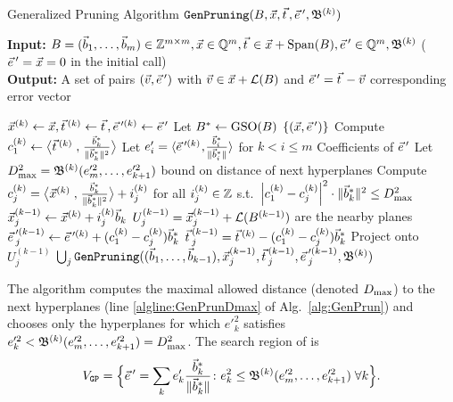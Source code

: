 %
%
\begin{algorithm}[t]
\caption{Generalized Pruning Algorithm $\GenPrun(\BMat, \protect \xvec, \protect \tvec, \protect \evec', \B^{(k)})$}
\label{alg:GenPrun}
\textbf{Input:} $\BMat=(\bvec_1, \ldots, \bvec_m) \in \Z^{m \times m}, \xvec\in\Q^m, \tvec \in \xvec+\Span(\BMat), \evec'\in\Q^m, \B^{(k)}$ \hfill ($\evec'=\xvec=0$ in the initial call)\\
\textbf{Output:} A set of pairs $(\vvec,\evec')$ with $\vvec\in \xvec+\Lat(\BMat)$ and $\evec' = \tvec-\vvec$ corresponding error vector
\begin{algorithmic}[1]
\State $\xvec^{(k)}\gets \xvec, \tvec^{(k)}\gets \tvec,\evec'^{(k)}\gets\evec'$ 
\State Let $B^*\gets\operatorname{GSO}(B)$
 \Return $\{(\xvec,\evec')\}$ \EndIf
\State Compute $c^{(k)}_1 \gets \bigScProd{\tvec^{(k)}}{\frac{\wbvec_k}{ \vphantom{\scalebox{1.6}x^2} \|\wbvec_k \|^2  }}$
\State
Let $e'_i = \ScProd{\evec'^{(k)}}{\frac{\wbvec_i}{\vphantom{\scalebox{1.6}x^2} \|\wbvec_i\|}}$ for $k< i \le m$ \Comment Coefficients of $\evec'$
\State Let $D_{\max}^2 = \mathfrak{B}^{(k)}(e'^2_m,\ldots,e'^2_{k+1})$ \Comment bound on distance of next hyperplanes \label{algline:GenPrunDmax}
\State Compute $c^{(k)}_j = \bigl\langle\vec x^{(k)}\mathrel{,}\frac{\vec b^*_k}{\|{\vec b^*_k}\|^2}\bigr\rangle + i^{(k)}_j$ for all $i^{(k)}_j \in {{\mathbb Z}}$ s.t.\
$\left|c_1^{(k)} - c_j^{(k)}\right|^2 \cdot \|\vec b^*_k \|^2 \leq D_{\max}^2$ \label{algline:GenPrunChoosePlane}
\For {\textbf{each} $(i^{(k)}_j, c^{(k)}_j)$} 
		\State $\vec x^{(k-1)}_j \gets \vec x^{(k)}+i^{(k)}_j \vec b_k$ \label{algline:GenPrunChooseTranslate}
		\Comment $U_j^{(k-1)} = \vec x^{(k-1)}_j+\mathcal{L}(B^{(k-1)})$ are the nearby planes
		\State $\evec'^{(k-1)}_j \gets \evec'^{(k)} + (c^{(k)}_1-c^{(k)}_j)\wbvec_k$
		\State $\tvec^{(k-1)}_j =\tvec^{(k)} - (c^{(k)}_1-c^{(k)}_j)\wbvec_k$ \Comment Project onto $U_j^{(k-1)}$ 
\State \Return $\bigcup_j \GenPrun ((\bvec_1,\ldots,\bvec_{k-1}), \xvec^{(k-1)}_j,\tvec^{(k-1)}_j,\evec'^{(k-1)}_j, \B^{(k)})$
\EndFor
\end{algorithmic} 
\end{algorithm}

The algorithm computes the maximal allowed distance (denoted $D_{\max}$) to the next hyperplanes (line \ref{algline:GenPrunDmax} of Alg.~\ref{alg:GenPrun}) and chooses only the hyperplanes for which $e'^2_k$ satisfies $e'^2_k < \mathfrak{B}^{(k)} (e'^2_m, \ldots, e'^2_{k+1}) = D_{\max}^2$. The search region of \GenPrun is
\begin{equation*} 
	V_{\GP} = \Bigl\{ \evec' = \sum_k e'_k \frac{\wbvec_k }{\| \wbvec_k \| } \colon e_k^2 \leq \B^{(k)}(e'^2_m, \ldots, e'^2_{k+1}) \; \forall k \Bigr\}.	
\end{equation*}

